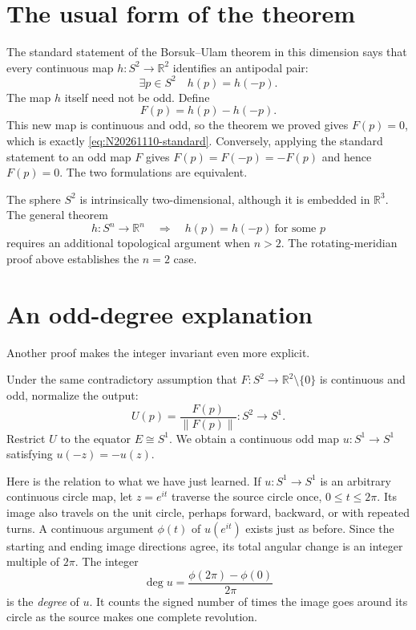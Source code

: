 \section{The usual form of the theorem}

The standard statement of the Borsuk--Ulam theorem in this dimension says that every continuous map $h:S^2\to\mathbb R^2$ identifies an antipodal pair:
\begin{equation}
 \exists p\in S^2\quad h(p)=h(-p).
 \label{eq:N20261110-standard}
\end{equation}
The map $h$ itself need not be odd. Define
\[
 F(p)=h(p)-h(-p).
\]
This new map is continuous and odd, so the theorem we proved gives $F(p)=0$, which is exactly \eqref{eq:N20261110-standard}. Conversely, applying the standard statement to an odd map $F$ gives $F(p)=F(-p)=-F(p)$ and hence $F(p)=0$. The two formulations are equivalent.

The sphere $S^2$ is intrinsically two-dimensional, although it is embedded in $\mathbb R^3$. The general theorem
\[
 h:S^n\to\mathbb R^n\quad\Longrightarrow\quad
 h(p)=h(-p)\ \text{for some }p
\]
requires an additional topological argument when $n>2$. The rotating-meridian proof above establishes the $n=2$ case.

\section{An odd-degree explanation}
Another proof makes the integer invariant even more explicit.

Under the same contradictory assumption that $F:S^2\to\mathbb R^2\setminus\{0\}$ is continuous and odd, normalize the output:
\[
 U(p)=\frac{F(p)}{\|F(p)\|}:S^2\to S^1.
\]
Restrict \(U\) to the equator \(E\cong S^1\). We obtain a continuous odd map \(u:S^1\to S^1\) satisfying \(u(-z)=-u(z)\).

Here is the relation to what we have just learned. If \(u:S^1\to S^1\) is an arbitrary continuous circle map, let \(z=e^{it}\) traverse the source circle once, \(0\leq t\leq2\pi\). Its image also travels on the unit circle, perhaps forward, backward, or with repeated turns. A continuous argument \(\phi(t)\) of \(u(e^{it})\) exists just as before. Since the starting and ending image directions agree, its total angular change is an integer multiple of \(2\pi\). The integer
\[
 \deg u=\frac{\phi(2\pi)-\phi(0)}{2\pi}
\]
is the \emph{degree} of \(u\). It counts the signed number of times the image goes around its circle as the source makes one complete revolution.

